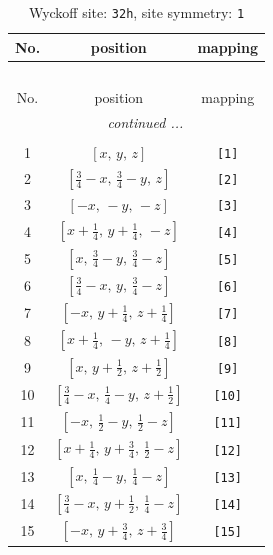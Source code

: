 \documentclass[fleqn,8pt]{jsarticle}
\begin{document}
\renewcommand{\arraystretch}{1.2}
\begin{longtable}{ccc}
\caption{Wyckoff site: {\tt 32h}, site symmetry: {\tt 1}}
 \\
 \hline \hline
No. & position & mapping \\ \hline \endfirsthead

\multicolumn{2}{l}{\tablename\ \thetable{}} \\
 \hline \hline
No. & position & mapping \\ \hline \endhead

 \hline \hline
\multicolumn{2}{r}{\footnotesize\it continued ...} \\ \endfoot

 \hline \hline
\multicolumn{2}{r}{} \\ \endlastfoot

1 & $\left[ x,\, y,\, z \right]$ & {\tt [1]} \\ \hline
2 & $\left[ \frac{3}{4} - x,\, \frac{3}{4} - y,\, z \right]$ & {\tt [2]} \\ \hline
3 & $\left[ - x,\, - y,\, - z \right]$ & {\tt [3]} \\ \hline
4 & $\left[ x + \frac{1}{4},\, y + \frac{1}{4},\, - z \right]$ & {\tt [4]} \\ \hline
5 & $\left[ x,\, \frac{3}{4} - y,\, \frac{3}{4} - z \right]$ & {\tt [5]} \\ \hline
6 & $\left[ \frac{3}{4} - x,\, y,\, \frac{3}{4} - z \right]$ & {\tt [6]} \\ \hline
7 & $\left[ - x,\, y + \frac{1}{4},\, z + \frac{1}{4} \right]$ & {\tt [7]} \\ \hline
8 & $\left[ x + \frac{1}{4},\, - y,\, z + \frac{1}{4} \right]$ & {\tt [8]} \\ \hline
9 & $\left[ x,\, y + \frac{1}{2},\, z + \frac{1}{2} \right]$ & {\tt [9]} \\ \hline
10 & $\left[ \frac{3}{4} - x,\, \frac{1}{4} - y,\, z + \frac{1}{2} \right]$ & {\tt [10]} \\ \hline
11 & $\left[ - x,\, \frac{1}{2} - y,\, \frac{1}{2} - z \right]$ & {\tt [11]} \\ \hline
12 & $\left[ x + \frac{1}{4},\, y + \frac{3}{4},\, \frac{1}{2} - z \right]$ & {\tt [12]} \\ \hline
13 & $\left[ x,\, \frac{1}{4} - y,\, \frac{1}{4} - z \right]$ & {\tt [13]} \\ \hline
14 & $\left[ \frac{3}{4} - x,\, y + \frac{1}{2},\, \frac{1}{4} - z \right]$ & {\tt [14]} \\ \hline
15 & $\left[ - x,\, y + \frac{3}{4},\, z + \frac{3}{4} \right]$ & {\tt [15]} \\ \hline

\end{longtable}
\end{document}

